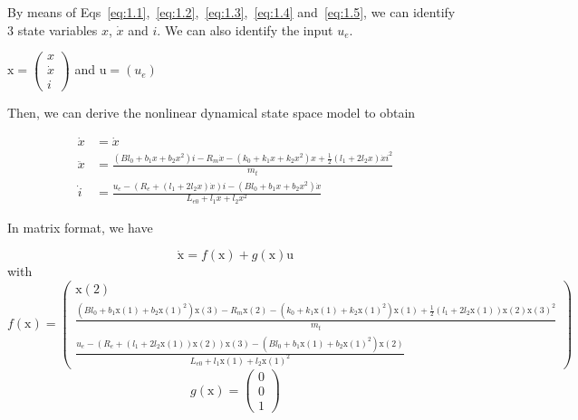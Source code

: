 By means of Eqs~\ref{eq:1.1},~\ref{eq:1.2},~\ref{eq:1.3},~\ref{eq:1.4} and~\ref{eq:1.5}, we can identify 3 state variables $x$,  $\dot{x}$ and $i$. We can also identify the input $u_e$.

$\text{x}=\begin{pmatrix}
   x \\
   \dot{x} \\
	 i
\end{pmatrix}$ and $\text{u}=(u_e)$

Then, we can derive the nonlinear dynamical state space model to obtain

\begin{align}
   \dot{x} &= \dot{x}\\
	 \ddot{x} &= \frac{(Bl_0+b_1x+b_2x^2)i-R_m\dot{x}-(k_0+k_1x+k_2x^2)x+\frac{1}{2}(l_1+2l_2x)\dot{x}i^2}{m_t}\\
	 \dot{i} &= \frac{u_e-(R_e+(l_1+2l_2x)\dot{x})i-(Bl_0+b_1x+b_2x^2)\dot{x}}{L_{e0}+l_1x+l_2x^2}
\end{align}

In matrix format, we have

\begin{equation}
	\label{eq:eqModel}
	\dot{\text{x}}=f(\text{x})+g(\text{x})\text{u}
\end{equation}
with
\begin{equation}
	\label{eq:f(x)}
	f(\text{x})=\begin{pmatrix}
   \text{x}(2) \\
	 \frac{(Bl_0+b_1\text{x}(1)+b_2\text{x}(1)^2)\text{x}(3)-R_m\text{x}(2)-(k_0+k_1\text{x}(1)+k_2\text{x}(1)^2)\text{x}(1)+\frac{1}{2}(l_1+2l_2\text{x}(1))\text{x}(2)\text{x}(3)^2}{m_t}\\
	 \frac{u_e-(R_e+(l_1+2l_2\text{x}(1))\text{x}(2))\text{x}(3)-(Bl_0+b_1\text{x}(1)+b_2\text{x}(1)^2)\text{x}(2)}{L_{e0}+l_1\text{x}(1)+l_2\text{x}(1)^2}
\end{pmatrix}
\end{equation}
\begin{equation}
	\label{eq:g(u)}
	g(\text{x})=\begin{pmatrix}
   0\\
   0 \\
	 1
\end{pmatrix}
\end{equation}
